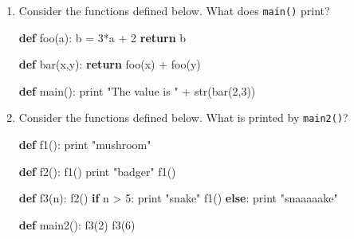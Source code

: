 \documentclass[]{article}
\newenvironment{Shaded}{}{}
\newcommand{\KeywordTok}[1]{\textcolor[rgb]{0.00,0.44,0.13}{\textbf{#1}}}
\newcommand{\DecValTok}[1]{\textcolor[rgb]{0.25,0.63,0.44}{#1}}
\newcommand{\StringTok}[1]{\textcolor[rgb]{0.25,0.44,0.63}{#1}}
\newcommand{\ControlFlowTok}[1]{\textcolor[rgb]{0.00,0.44,0.13}{\textbf{#1}}}
\newcommand{\OperatorTok}[1]{\textcolor[rgb]{0.40,0.40,0.40}{#1}}
\newcommand{\BuiltInTok}[1]{#1}
\newcommand{\NormalTok}[1]{#1}
\begin{document}
\begin{enumerate}
\def\labelenumi{\arabic{enumi}.}
\item
  Consider the functions defined below. What does \texttt{main()} print?

\begin{Shaded}
\begin{Highlighting}[]
\KeywordTok{def}\NormalTok{ foo(a):}
\NormalTok{    b }\OperatorTok{=} \DecValTok{3}\OperatorTok{*}\NormalTok{a }\OperatorTok{+} \DecValTok{2}
    \ControlFlowTok{return}\NormalTok{ b}

\KeywordTok{def}\NormalTok{ bar(x,y):}
    \ControlFlowTok{return}\NormalTok{ foo(x) }\OperatorTok{+}\NormalTok{ foo(y)}

\KeywordTok{def}\NormalTok{ main():}
    \BuiltInTok{print} \StringTok{"The value is "} \OperatorTok{+} \BuiltInTok{str}\NormalTok{(bar(}\DecValTok{2}\NormalTok{,}\DecValTok{3}\NormalTok{))}
\end{Highlighting}
\end{Shaded}
\item
  Consider the functions defined below. What is printed by
  \texttt{main2()}?

\begin{Shaded}
\begin{Highlighting}[]
\KeywordTok{def}\NormalTok{ f1():}
    \BuiltInTok{print} \StringTok{"mushroom"}

\KeywordTok{def}\NormalTok{ f2():}
\NormalTok{    f1()}
    \BuiltInTok{print} \StringTok{"badger"}
\NormalTok{    f1()}

\KeywordTok{def}\NormalTok{ f3(n):}
\NormalTok{    f2()}
    \ControlFlowTok{if}\NormalTok{ n }\OperatorTok{>} \DecValTok{5}\NormalTok{:}
        \BuiltInTok{print} \StringTok{"snake"}
\NormalTok{        f1()}
    \ControlFlowTok{else}\NormalTok{:}
        \BuiltInTok{print} \StringTok{"snaaaaake"}

\KeywordTok{def}\NormalTok{ main2():}
\NormalTok{    f3(}\DecValTok{2}\NormalTok{)}
\NormalTok{    f3(}\DecValTok{6}\NormalTok{)}
\end{Highlighting}
\end{Shaded}
\end{enumerate}
\end{document}

